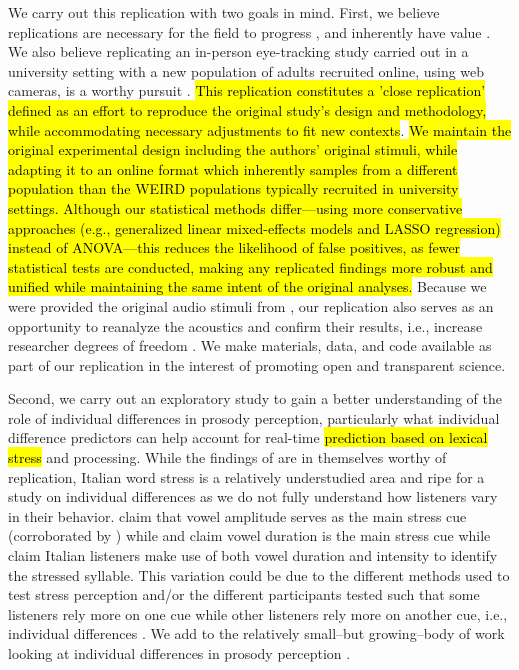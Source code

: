 {We carry out this replication with two goals in mind. First, we believe replications are necessary for the field to progress \citep{Rakosi2017}, and inherently have value \citep{Kobrock2023}. We also believe replicating an in-person eye-tracking study carried out in a university setting with a new population of adults recruited online, using web cameras, is a worthy pursuit \citep{Prystauka_Altmann_Rothman_2023}. \hl{This replication constitutes a 'close replication' 
defined as an effort to reproduce the original study's design and methodology, while accommodating necessary adjustments to fit new contexts}\citep{mcmanus2022replication}. \hl{We maintain the original experimental design including the authors' original stimuli, while adapting it to an online format which inherently samples from a different population than the WEIRD populations typically recruited in university settings. Although our statistical methods differ—using more conservative approaches (e.g., generalized linear mixed-effects models and LASSO regression) instead of ANOVA—this reduces the likelihood of false positives, as fewer statistical tests are conducted, making any replicated findings more robust and unified while maintaining the same intent of the original analyses.} Because we were provided the original audio stimuli from \cite{Sulpizio_McQueen_2012}, our replication also serves as an opportunity to reanalyze the acoustics and confirm their results, i.e., increase researcher degrees of freedom \citep{Corretta2023}. We make materials, data, and code available as part of our replication in the interest of promoting open and transparent science.

Second, we carry out an exploratory study to gain a better understanding of the role of individual differences in prosody perception, particularly what individual difference predictors can help account for real-time \hl{prediction based on lexical stress} and processing. While the findings of \cite{Sulpizio_McQueen_2012} are in themselves worthy of replication, Italian word stress is a relatively understudied area and ripe for a study on individual differences as we do not fully understand how listeners vary in their behavior. \cite{Maturi1998} claim that vowel amplitude serves as the main stress cue (corroborated by \cite{Sulpizio_McQueen_2012}) while \cite{Alfano2006} and \cite{Alfano2009} claim vowel duration is the main stress cue while \cite{Tagliapietra2005} claim Italian listeners make use of both vowel duration and intensity to identify the stressed syllable. This variation could be due to the different methods used to test stress perception and/or the different participants tested such that some listeners rely more on one cue while other listeners rely more on another cue, i.e., individual differences  \citep{Yu2019, Kidd2018}. We add to the relatively small--but growing--body of work looking at individual differences in prosody perception \citep[e.g.,][]{Roy2017, Bishop2017, Lameris2023, Sinagra2022}.

}
